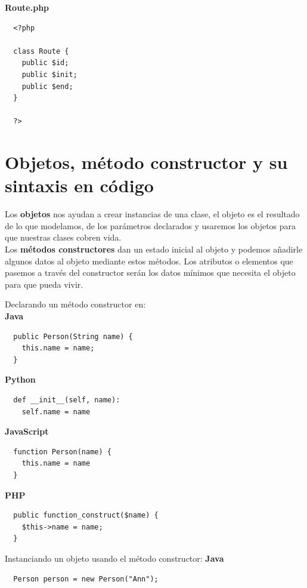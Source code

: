 \documentclass{article}
\begin{document}
\textbf{Route.php}
\begin{verbatim}
  <?php

  class Route {
    public $id;
    public $init;
    public $end;
  }

  ?>
\end{verbatim}

\newpage
\section{Objetos, método constructor y su sintaxis en código}%
Los \textbf{objetos} nos ayudan a crear instancias de una clase, el objeto es el
resultado de lo que modelamos, de los parámetros declarados y usaremos los
objetos para que nuestras clases cobren vida.\\

Los \textbf{métodos constructores} dan un estado inicial al objeto y podemos
añadirle algunos datos al objeto mediante estos métodos. Los atributos o
elementos que pasemos a través del constructor serán los datos mínimos que
necesita el objeto para que pueda vivir.

Declarando un método constructor en:\\

\textbf{Java}

\begin{verbatim}
  public Person(String name) {
    this.name = name;
  }
\end{verbatim}

\textbf{Python}

\begin{verbatim}
  def __init__(self, name):
    self.name = name
\end{verbatim}

\textbf{JavaScript}

\begin{verbatim}
  function Person(name) {
    this.name = name
  }
\end{verbatim}

\textbf{PHP}

\begin{verbatim}
  public function_construct($name) {
    $this->name = name;
  }
\end{verbatim}

Instanciando un objeto usando el método constructor:
\textbf{Java}

\begin{verbatim}
  Person person = new Person("Ann");
\end{verbatim}
\end{document}
